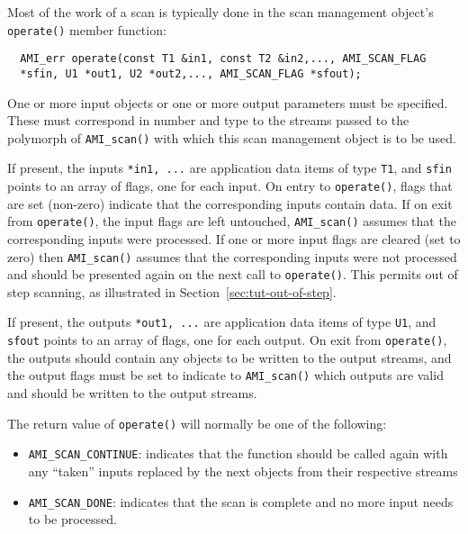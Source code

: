  Most of the work of a scan is
typically done in the scan management object's \lstinline|operate()|
member function:
\begin{lstlisting}
  AMI_err operate(const T1 &in1, const T2 &in2,..., AMI_SCAN_FLAG
  *sfin, U1 *out1, U2 *out2,..., AMI_SCAN_FLAG *sfout);
\end{lstlisting}
    
One or more input objects or one or more output parameters must be
specified.  These must correspond in number and type to the streams
passed to the polymorph of \lstinline|AMI_scan()| with which this scan
management object is to be used.
    
If present, the inputs \lstinline|*in1, ...| are application data
items of type \lstinline|T1|, and \lstinline|sfin| points to an array
of flags, one for each input.  On entry to \lstinline|operate()|,
flags that are set (non-zero) indicate that the corresponding inputs
contain data.  If on exit from \lstinline|operate()|, the input flags
are left untouched, \lstinline|AMI_scan()| assumes that the
corresponding inputs were processed.  If one or more input flags are
cleared (set to zero) then \lstinline|AMI_scan()| assumes that the
corresponding inputs were not processed and should be presented again
on the next call to \lstinline|operate()|.  This permits out of step
scanning, as illustrated in
Section~\ref{sec:tut-out-of-step}.
    
If present, the outputs \lstinline|*out1, ...| are application data
items of type \lstinline|U1|, and \lstinline|sfout| points to an array
of flags, one for each output. On exit from \lstinline|operate()|, the
outputs should contain any objects to be written to the output
streams, and the output flags must be set to indicate to
\lstinline|AMI_scan()| which outputs are valid and should be written
to the output streams.
    
The return value of \lstinline|operate()| will normally be one of the
following:
    \begin{itemize}
    \item \lstinline|AMI_SCAN_CONTINUE|:  indicates that the function should be
      called again with any ``taken'' inputs replaced by the next
      objects from their respective streams
    \item \lstinline|AMI_SCAN_DONE|:  indicates that the scan is complete and no
      more input needs to be processed.
    \end{itemize}
    

